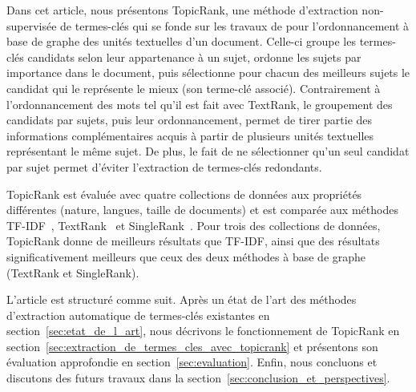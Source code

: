   Dans cet article, nous présentons TopicRank, une méthode d'extraction
  non-supervisée de termes-clés qui se fonde sur les travaux de
   pour l'ordonnancement à base de
  graphe des unités textuelles d'un document. Celle-ci groupe les termes-clés
  candidats selon leur appartenance à un sujet, ordonne les sujets par
  importance dans le document, puis sélectionne pour chacun des meilleurs sujets
  le candidat qui le représente le mieux (son terme-clé associé).
  Contrairement à l'ordonnancement des mots tel qu'il est fait avec TextRank,
  le groupement des candidats par sujets, puis leur ordonnancement, permet de
  tirer partie des informations complémentaires acquis à partir de plusieurs
  unités textuelles représentant le même sujet. De plus, le fait de ne
  sélectionner qu'un seul candidat par sujet permet d'éviter l'extraction de
  termes-clés redondants.

  TopicRank est évaluée avec quatre collections de données aux propriétés
  différentes (nature, langues, taille de documents) et est comparée aux
  méthodes TF-IDF~\cite{jones1972tfidf}, TextRank~\cite{mihalcea2004textrank} et
  SingleRank~\cite{wan2008expandrank}. Pour trois des collections de données,
  TopicRank donne de meilleurs résultats que TF-IDF, ainsi que des résultats
  significativement meilleurs que ceux des deux méthodes à base de graphe
  (TextRank et SingleRank).

  L'article est structuré comme suit. Après un état de l'art des méthodes
  d'extraction automatique de termes-clés existantes en
  section~\ref{sec:etat_de_l_art}, nous décrivons le fonctionnement de TopicRank
  en section~\ref{sec:extraction_de_termes_cles_avec_topicrank} et présentons
  son évaluation approfondie en section~\ref{sec:evaluation}. Enfin, nous
  concluons et discutons des futurs travaux dans la
  section~\ref{sec:conclusion_et_perspectives}.

